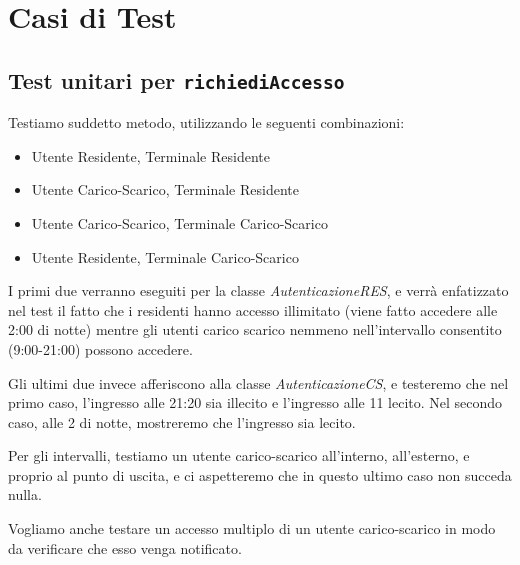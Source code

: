 \documentclass[12pt, letterpaper]{article}
\begin{document}
\section{Casi di Test}

\subsection{Test unitari per \texttt{richiediAccesso}}
Testiamo suddetto metodo, utilizzando le seguenti
combinazioni:
\begin{itemize}
    \item Utente Residente, Terminale Residente 
    \item Utente Carico-Scarico, Terminale Residente 
    \item Utente Carico-Scarico, Terminale Carico-Scarico 
    \item Utente Residente, Terminale Carico-Scarico
\end{itemize}

\noindent
I primi due verranno eseguiti per la classe 
\emph{AutenticazioneRES}, e verrà enfatizzato
nel test il fatto che i residenti hanno accesso 
illimitato (viene fatto accedere alle 2:00 di notte)
mentre gli utenti carico scarico nemmeno 
nell'intervallo consentito (9:00-21:00) possono 
accedere.

\noindent
Gli ultimi due invece afferiscono alla classe 
\emph{AutenticazioneCS}, e testeremo che nel 
primo caso, l'ingresso alle 21:20 sia illecito e 
l'ingresso alle 11 lecito. Nel secondo caso,
alle 2 di notte, mostreremo che l'ingresso 
sia lecito.

\noindent
Per gli intervalli, testiamo un utente carico-scarico 
all'interno, all'esterno, e proprio al punto di uscita,
e ci aspetteremo che in questo ultimo caso non 
succeda nulla.

\noindent
Vogliamo anche testare un accesso multiplo di 
un utente carico-scarico in modo da verificare 
che esso venga notificato.
\end{document}
